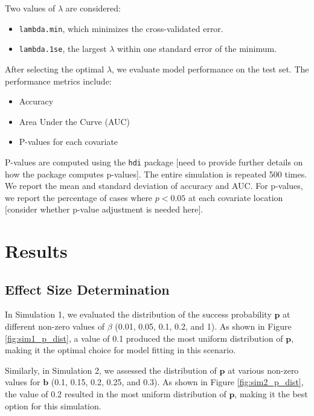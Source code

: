 \documentclass[12pt]{article}
\begin{document}
Two values of \( \lambda \) are considered: 
\begin{itemize}
  \item \texttt{lambda.min}, which minimizes the cross-validated error.
  \item \texttt{lambda.1se}, the largest \( \lambda \) within one standard error of the minimum.
\end{itemize}

After selecting the optimal \( \lambda \), we evaluate model performance on the test set. The performance metrics include:
\begin{itemize}
  \item Accuracy
  \item Area Under the Curve (AUC)
  \item P-values for each covariate
\end{itemize}

P-values are computed using the \texttt{hdi} package [need to provide further details on how the package computes p-values]. The entire simulation is repeated 500 times. We report the mean and standard deviation of accuracy and AUC. For p-values, we report the percentage of cases where \( p < 0.05 \) at each covariate location [consider whether p-value adjustment is needed here].


\section*{Results}

\subsection*{Effect Size Determination}

In Simulation 1, we evaluated the distribution of the success probability \( \mathbf{p} \) at different non-zero values of \( \beta \) (0.01, 0.05, 0.1, 0.2, and 1). As shown in Figure \ref{fig:sim1_p_dist}, a value of 0.1 produced the most uniform distribution of \( \mathbf{p} \), making it the optimal choice for model fitting in this scenario.

Similarly, in Simulation 2, we assessed the distribution of \( \mathbf{p} \) at various non-zero values for \( \mathbf{b} \) (0.1, 0.15, 0.2, 0.25, and 0.3). As shown in Figure \ref{fig:sim2_p_dist}, the value of 0.2 resulted in the most uniform distribution of \( \mathbf{p} \), making it the best option for this simulation.
\end{document}
